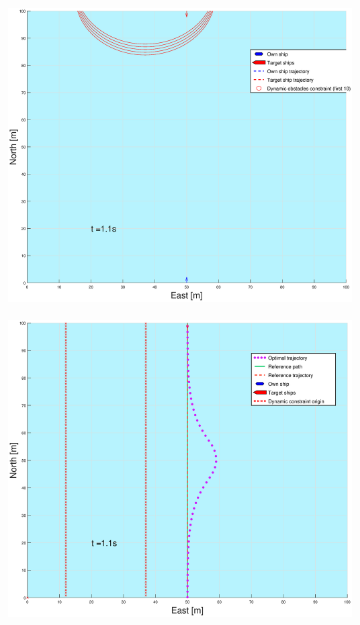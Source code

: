 \begin{figure}[!b]
\begin{subfigure}[b]{0.499\textwidth}
    \end{subfigure}
    \hfill
    \\
    \begin{subfigure}[b]{0.49\textwidth}
        \centering
        \includegraphics[width=\textwidth]{Images/Figures/enkel_HO/_Simple_1fig1_time=1}
    \end{subfigure}
    \hfill
    \begin{subfigure}[b]{0.499\textwidth}
        \centering
        \includegraphics[width=\textwidth]{Images/Figures/enkel_HO/_Simple_1fig999_time=1}

\end{subfigure}
\end{figure}
